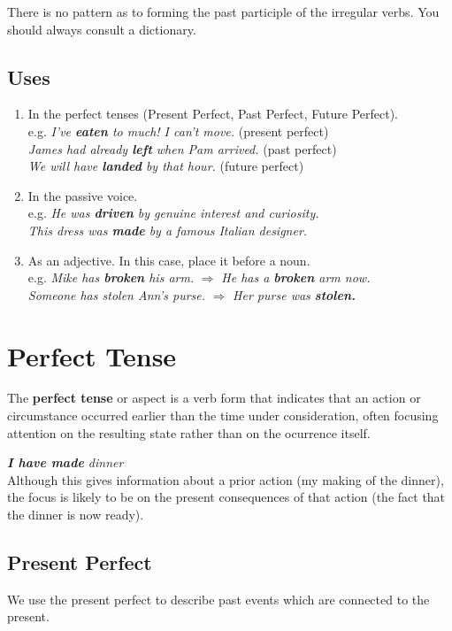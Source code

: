 \documentclass[hidelinks,10pt,a4paper]{article}
\begin{document}
There is no pattern as to forming the past participle of the irregular verbs. You should always consult a dictionary.

\subsection{Uses}
\begin{enumerate}[label=(\alph*)]
	\item In the perfect tenses (Present Perfect, Past Perfect, Future Perfect). \\
		e.g. \textit{I've \textbf{eaten} to much! I can't move.} (present perfect) \\
			\textit{James had already \textbf{left} when Pam arrived.} (past perfect) \\
			\textit{We will have \textbf{landed} by that hour.} (future perfect)
	\item In the passive voice. \\
		e.g. \textit{He was \textbf{driven} by genuine interest and curiosity.\\
		This dress was \textbf{made} by a famous Italian designer.}
	\item As an adjective. In this case, place it before a noun. \\
		e.g. \textit{Mike has \textbf{broken} his arm.} $\Rightarrow$ \textit{He has a \textbf{broken} arm now.\\
		Someone has stolen Ann's purse.} $\Rightarrow$ \textit{Her purse was \textbf{stolen.} }
\end{enumerate}

\section{Perfect Tense}
The \textbf{perfect tense} or aspect is a verb form that indicates that an action or circumstance occurred earlier than the time under consideration, often focusing attention on the resulting state rather than on the ocurrence itself.

\begin{center}
	\textit{ \textbf{I have made} dinner}\\
	Although this gives information about a prior action (my making of the dinner), the focus is likely to be on the present consequences of that action (the fact that the dinner is now ready).
\end{center}

\subsection{Present Perfect}
We use the present perfect to describe past events which are connected to the present.
\end{document}
